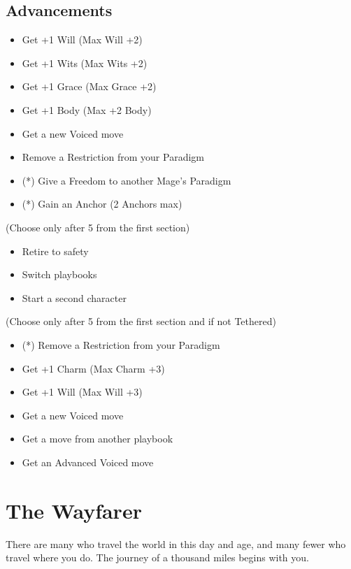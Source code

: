 \documentclass[
]{memoir}
\begin{document}
\hypertarget{advancements-7}{%
\subsection{Advancements}\label{advancements-7}}

\begin{itemize}
\tightlist
\item
  Get +1 Will (Max Will +2)
\item
  Get +1 Wits (Max Wits +2)
\item
  Get +1 Grace (Max Grace +2)
\item
  Get +1 Body (Max +2 Body)
\item
  Get a new Voiced move
\item
  Remove a Restriction from your Paradigm
\item
  (*) Give a Freedom to another Mage's Paradigm
\item
  (*) Gain an Anchor (2 Anchors max)
\end{itemize}

(Choose only after 5 from the first section)

\begin{itemize}
\tightlist
\item
  Retire to safety
\item
  Switch playbooks
\item
  Start a second character
\end{itemize}

(Choose only after 5 from the first section and if not Tethered)

\begin{itemize}
\tightlist
\item
  (*) Remove a Restriction from your Paradigm
\item
  Get +1 Charm (Max Charm +3)
\item
  Get +1 Will (Max Will +3)
\item
  Get a new Voiced move
\item
  Get a move from another playbook
\item
  Get an Advanced Voiced move
\end{itemize}

\newpage

\hypertarget{the-wayfarer}{%
\section{The Wayfarer}\label{the-wayfarer}}

There are many who travel the world in this day and age, and many fewer
who travel where you do. The journey of a thousand miles begins with
you.
\end{document}
